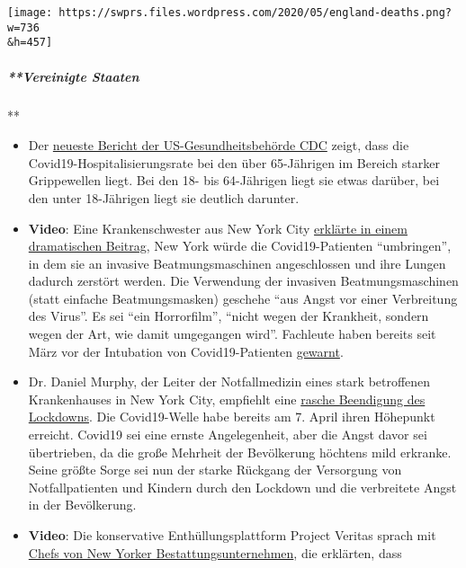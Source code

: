 \texttt{[image: https://swprs.files.wordpress.com/2020/05/england-deaths.png?w=736\\\&h=457]}

\hypertarget{vereinigte-staaten}{%
\subparagraph{**Vereinigte Staaten}\label{vereinigte-staaten}}

**

\begin{itemize}
\tightlist
\item
  Der
  \href{https://www.cdc.gov/coronavirus/2019-ncov/covid-data/covidview/index.html}{neueste
  Bericht der US-Gesundheitsbehörde CDC} zeigt, dass die
  Covid19-Hospitali­sierungs­rate bei den über 65-Jährigen im Bereich
  starker Grippewellen liegt. Bei den 18- bis 64-Jährigen liegt sie
  etwas darüber, bei den unter 18-Jährigen liegt sie deutlich darunter.
\item
  \textbf{Video}: Eine Krankenschwester aus New York City
  \href{https://www.dailymail.co.uk/news/article-8262351/Nurse-New-York-claims-city-killing-COVID-19-patients-putting-ventilators.html}{erklärte
  in einem dramatischen Beitrag}, New York würde die Covid19-Patienten
  ``umbringen'', in dem sie an invasive Beatmungs­maschinen
  angeschlossen und ihre Lungen dadurch zerstört werden. Die Verwendung
  der invasiven Beatmungs­maschinen (statt einfache Beatmungsmasken)
  geschehe ``aus Angst vor einer Verbreitung des Virus''. Es sei ``ein
  Horrorfilm'', ``nicht wegen der Krankheit, sondern wegen der Art, wie
  damit umgegangen wird''. Fachleute haben bereits seit März vor der
  Intubation von Covid19-Patienten
  \href{https://off-guardian.org/2020/05/06/covid19-are-ventilators-killing-people/}{gewarnt}.
\item
  Dr. Daniel Murphy, der Leiter der Notfallmedizin eines stark
  betroffenen Krankenhauses in New York City, empfiehlt eine
  \href{https://nypost.com/2020/04/27/ive-worked-the-coronavirus-front-line-and-i-say-its-time-to-start-opening-up/}{rasche
  Beendigung des Lockdowns}. Die Covid19-Welle habe bereits am 7. April
  ihren Höhepunkt erreicht. Covid19 sei eine ernste Angelegenheit, aber
  die Angst davor sei übertrieben, da die große Mehrheit der Bevölkerung
  höchtens mild erkranke. Seine größte Sorge sei nun der starke Rückgang
  der Versorgung von Notfallpatienten und Kindern durch den Lockdown und
  die verbreitete Angst in der Bevölkerung.
\item
  \textbf{Video}: Die konservative Enthüllungs­plattform Project Veritas
  sprach mit \href{https://www.youtube.com/watch?v=g5f_6ltv7oI}{Chefs
  von New Yorker Bestattungs­­unter­­nehmen}, die erklärten, dass

\end{itemize}
